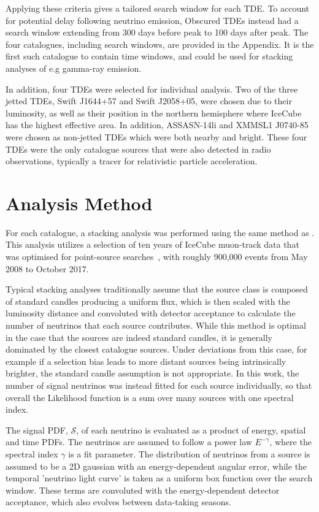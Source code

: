 \documentclass[twocolumn, tighten, linenumbers]{aastex62}
\begin{document}
Applying these criteria gives a tailored search window for each TDE. To account for potential delay following neutrino emission, Obscured TDEs instead had a search window extending from 300 days before peak to 100 days after peak. The four catalogues, including search windows, are provided in the Appendix. It is the first such catalogue to contain time windows, and could be used for stacking analyses of e.g gamma-ray emission.

In addition, four TDEs were selected for individual analysis. Two of the three jetted TDEs, Swift J1644+57 and Swift J2058+05, were chosen due to their luminosity, as well as their position in the northern hemisphere where IceCube has the highest effective area. In addition, ASSASN-14li and  XMMSL1 J0740-85 were chosen as non-jetted TDEs which were both nearby and bright. These four TDEs were the only catalogue sources that were also detected in radio observations, typically a tracer for relativistic particle acceleration.

% 
\section{Analysis Method}
\label{sec:AnalysisMethod}
For each catalogue, a stacking analysis was performed using the same method as \cite{stasik}.
This analysis utilizes a selection of ten years of IceCube muon-track data that was optimised for point-source searches~\citep{Aartsen:2016oji}, with roughly 900,000 events from May 2008 to October 2017. 

Typical stacking analyses traditionally assume that the source class is composed of standard candles producing a uniform flux, which is then scaled with the luminosity distance and convoluted with detector acceptance to calculate the number of neutrinos that each source contributes. While this method is optimal in the case that the sources are indeed standard candles, it is generally dominated by the closest catalogue sources. Under deviations from this case, for example if a selection bias leads to more distant sources being intrinsically brighter, the standard candle assumption is not appropriate. In this work, the number of signal neutrinos was instead fitted for each source individually, so that overall the Likelihood function is a sum over many sources with one spectral index.

The signal PDF, $\mathcal{S}$, of each neutrino is evaluated as a product of energy, spatial and time PDFs. The neutrinos are assumed to follow a power law $E^{-\gamma}$, where the spectral index $\gamma$ is a fit parameter. The distribution of neutrinos from a source is assumed to be a 2D gaussian with an energy-dependent angular error, while the temporal 'neutrino light curve' is taken as a uniform box function over the search window. These terms are convoluted with the energy-dependent detector acceptance, which also evolves between data-taking seasons. 
\end{document}
